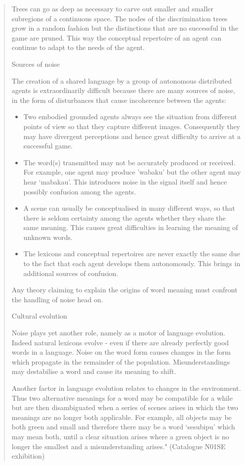 \begin{quotation}
Trees can go as deep as necessary to carve out smaller and smaller subregions of a continuous space. The nodes
of the discrimination trees grow in a random fashion but the distinctions that are no successful in the game are 
pruned. This way the conceptual repertoire of an agent can continue to adapt to the needs of the agent. 

\noindent
{\bfshape Sources of noise}

\noindent
The creation of a shared language by a group of autonomous distributed agents is extraordinarily difficult 
because there are many sources of noise, in the form of disturbances that cause incoherence between the agents: 
\begin{itemize} 
\item Two embodied grounded agents always see the situation from different points of view so that they capture 
different images. Consequently they may have divergent perceptions and hence great difficulty to arrive at a 
successful game. 
\item The word(s) transmitted may not be accurately produced or received. For example, one agent may produce 
'wabaku' but the other agent may hear `mabakau'. This introduces noise in the signal itself and hence 
possibly confusion among the agents. 
\item A scene can usually be conceptualised in many different ways, so that there is seldom certainty among 
the agents whether they share the same meaning. This causes great difficulties in learning 
the meaning of unknown words. 
\item The lexicons and conceptual repertoires are never exactly the same due to the fact that each agent
develops them autonomously. This brings in additional sources of confusion. 
\end{itemize}
Any theory claiming to explain the origins of word meaning must confront the handling of 
noise head on. 

\noindent
{\bfshape Cultural evolution}

\noindent
Noise plays yet another role, namely as a motor of language evolution. Indeed natural lexicons evolve - 
even if there are already perfectly good words in a language. Noise on the word form causes changes 
in the form which propagate in the remainder of the population. Misunderstandings may destabilise a
word and cause its meaning to shift. 

Another factor in language evolution relates to changes in the environment. Thus two alternative 
meanings for a word may be compatible for a while but are then disambiguated when a series of scenes
arises in which the two meanings are no longer both applicable. For example, all objects may be both 
green and small and therefore there may be a word `sesubipu' which may mean both, until a clear 
situation arises where a green object is no longer the smallest and a misunderstanding arises." (Catalogue N01SE exhibition)
\end{quotation}

